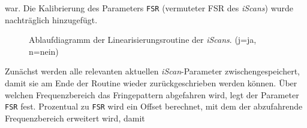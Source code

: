 war. Die Kalibrierung des Parameters \lstinline|FSR| (vermuteter FSR des
\textit{iScans}) wurde nachträglich hinzugefügt.\par
\begin{figure}[hp]
 	\centering
	\caption[Linearisierung der \textit{iScans} -
	Ablaufdiagramm]{Ablaufdiagramm der Linearisierungsroutine
	der \textit{iScans}. (j=ja, n=nein)}
	\label{fig:linearisierung_ablaufdiagramm}
\end{figure}
Zunächst werden alle relevanten aktuellen \textit{iScan}-Parameter
zwischengespeichert, damit sie am Ende der Routine wieder zurückgeschrieben
werden können. Über welchen Frequenzbereich das Fringepattern abgefahren wird,
legt der Parameter \lstinline|FSR| fest.
Prozentual zu \lstinline|FSR| wird ein Offset berechnet, mit dem der abzufahrende Frequenzbereich erweitert wird, damit
